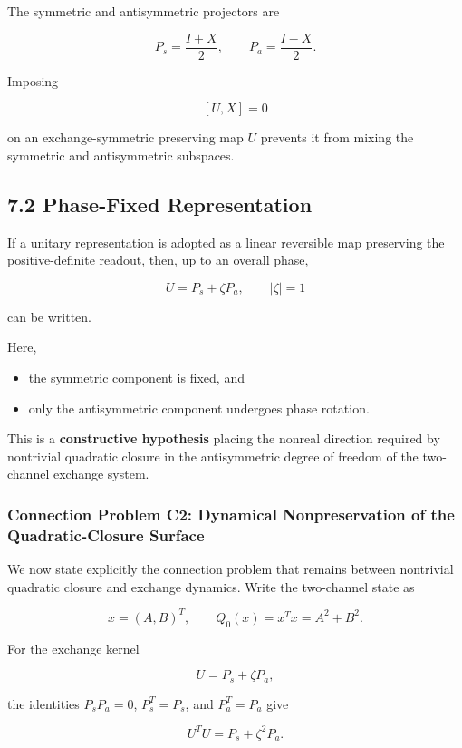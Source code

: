 \documentclass[
  a4paper,
  10pt]{article}
\providecommand{\tightlist}{%
  \setlength{\itemsep}{0pt}\setlength{\parskip}{0pt}}
\begin{document}
The symmetric and antisymmetric projectors are

\[
P_s=\frac{I+X}{2},
\qquad
P_a=\frac{I-X}{2}.
\]

Imposing

\[
[U,X]=0
\]

on an exchange-symmetric preserving map \(U\) prevents it from mixing
the symmetric and antisymmetric subspaces.

\subsection{7.2 Phase-Fixed
Representation}\label{72-phase-fixed-representation}

If a unitary representation is adopted as a linear reversible map
preserving the positive-definite readout, then, up to an overall phase,

\[
\boxed{
U=P_s+\zeta P_a,
\qquad |\zeta|=1
}
\]

can be written.

Here,

\begin{itemize}
\tightlist
\item
  the symmetric component is fixed, and
\item
  only the antisymmetric component undergoes phase rotation.
\end{itemize}

This is a \textbf{constructive hypothesis} placing the nonreal direction
required by nontrivial quadratic closure in the antisymmetric degree of
freedom of the two-channel exchange system.

\subsubsection{Connection Problem C2: Dynamical Nonpreservation of the
Quadratic-Closure
Surface}\label{connection-problem-c2-dynamical-nonpreservation-of-the-quadratic-closure-surface}

We now state explicitly the connection problem that remains between
nontrivial quadratic closure and exchange dynamics. Write the
two-channel state as

\[
x=(A,B)^T,
\qquad
Q_0(x)=x^Tx=A^2+B^2.
\]

For the exchange kernel

\[
U=P_s+\zeta P_a,
\]

the identities \(P_sP_a=0\), \(P_s^T=P_s\), and \(P_a^T=P_a\) give

\[
U^TU=P_s+\zeta^2P_a.
\]
\end{document}
